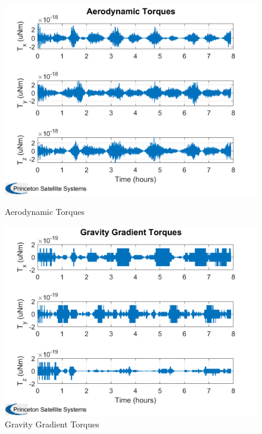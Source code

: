 \begin{itemize}
\begin{figure}[H]
    \centering
    \begin{minipage}{0.48\linewidth}
        \centering
        \includegraphics[width=0.95\linewidth]{res/img/Nadir_no_EKF/Aerodynamic Torques.png}
        \caption{Aerodynamic Torques}
        \label{fig:AerodynamicTorques}
    \end{minipage}\hfill
    \begin{minipage}{0.48\linewidth}
        \centering
        \includegraphics[width=0.95\linewidth]{res/img/Nadir_no_EKF/Gravity Gradient Torques.png}
        \caption{Gravity Gradient Torques}
        \label{fig:GravityGradientTorques}
    \end{minipage}
\end{figure}


\end{itemize}
